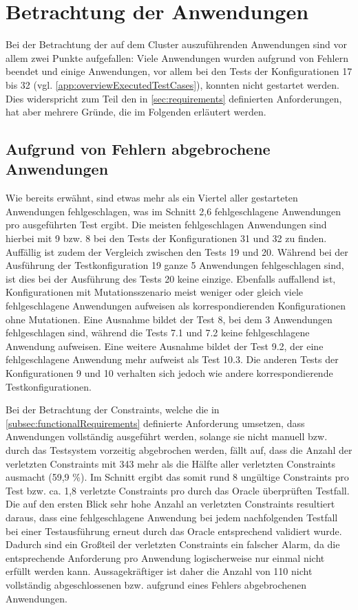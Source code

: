\section{Betrachtung der Anwendungen}
\label{sec:appEval}

Bei der Betrachtung der auf dem Cluster auszuführenden Anwendungen sind vor allem zwei Punkte aufgefallen:
Viele Anwendungen wurden aufgrund von Fehlern beendet und einige Anwendungen, vor allem bei den Tests der Konfigurationen 17 bis 32 (vgl. \cref{app:overviewExecutedTestCases}), konnten nicht gestartet werden.
Dies widerspricht zum Teil den in \cref{sec:requirements} definierten Anforderungen, hat aber mehrere Gründe, die im Folgenden erläutert werden.

\subsection{Aufgrund von Fehlern abgebrochene Anwendungen}
\label{subsec:failedApps}

Wie bereits erwähnt, sind etwas mehr als ein Viertel aller gestarteten Anwendungen fehlgeschlagen, was im Schnitt 2,6 fehlgeschlagene Anwendungen pro ausgeführten Test ergibt.
Die meisten fehlgeschlagen Anwendungen sind hierbei mit 9 bzw. 8 bei den Tests der Konfigurationen 31 und 32 zu finden.
Auffällig ist zudem der Vergleich zwischen den Tests 19 und 20.
Während bei der Ausführung der Testkonfiguration 19 ganze 5 Anwendungen fehlgeschlagen sind, ist dies bei der Ausführung des Tests 20 keine einzige.
Ebenfalls auffallend ist, Konfigurationen mit Mutationsszenario meist weniger oder gleich viele fehlgeschlagene Anwendungen aufweisen als korrespondierenden Konfigurationen ohne Mutationen.
Eine Ausnahme bildet der Test 8, bei dem 3 Anwendungen fehlgeschlagen sind, während die Tests 7.1 und 7.2 keine fehlgeschlagene Anwendung aufweisen.
Eine weitere Ausnahme bildet der Test 9.2, der eine fehlgeschlagene Anwendung mehr aufweist als Test 10.3. Die anderen Tests der Konfigurationen 9 und 10 verhalten sich jedoch wie andere korrespondierende Testkonfigurationen.

Bei der Betrachtung der Constraints, welche die in \cref{subsec:functionalRequirements} definierte Anforderung umsetzen, dass Anwendungen vollständig ausgeführt werden, solange sie nicht manuell bzw. durch das Testsystem vorzeitig abgebrochen werden, fällt auf, dass die Anzahl der verletzten Constraints mit 343 mehr als die Hälfte aller verletzten Constraints ausmacht (59,9 \%).
Im Schnitt ergibt das somit rund 8 ungültige Constraints pro Test bzw. ca. 1,8 verletzte Constraints pro durch das Oracle überprüften Testfall.
Die auf den ersten Blick sehr hohe Anzahl an verletzten Constraints resultiert daraus, dass eine fehlgeschlagene Anwendung bei jedem nachfolgenden Testfall bei einer Testausführung erneut durch das Oracle entsprechend validiert wurde.
Dadurch sind ein Großteil der verletzten Constraints ein falscher Alarm, da die entsprechende Anforderung pro Anwendung logischerweise nur einmal nicht erfüllt werden kann.
Aussagekräftiger ist daher die Anzahl von 110 nicht vollständig abgeschlossenen bzw. aufgrund eines Fehlers abgebrochenen Anwendungen.

